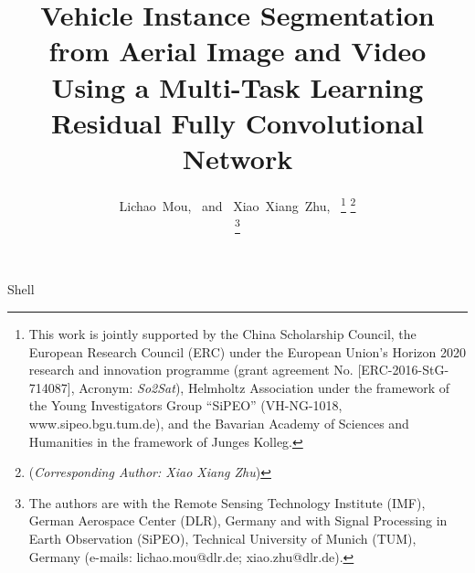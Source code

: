 \documentclass[journal]{IEEEtran}
\begin{document}
\title{Vehicle Instance Segmentation from Aerial Image and Video Using a Multi-Task Learning Residual Fully Convolutional Network}
\author{Lichao~Mou,~ and
       ~Xiao~Xiang~Zhu,~
\thanks{This work is jointly supported by the China Scholarship Council, the European Research Council (ERC) under the European Union's Horizon 2020 research and innovation programme (grant agreement No. [ERC-2016-StG-714087], Acronym: \textit{So2Sat}), Helmholtz Association under the framework of the Young Investigators Group ``SiPEO'' (VH-NG-1018, www.sipeo.bgu.tum.de), and the Bavarian Academy of Sciences and Humanities in the framework of Junges Kolleg. }
\thanks{(\textit{Corresponding Author: Xiao Xiang Zhu})}

\thanks{The authors are with the Remote Sensing Technology Institute (IMF), German Aerospace Center (DLR), Germany and with Signal Processing in Earth Observation (SiPEO), Technical University of Munich (TUM), Germany (e-mails: lichao.mou@dlr.de; xiao.zhu@dlr.de).}
       }%

%
{Shell }

\maketitle
\end{document}
